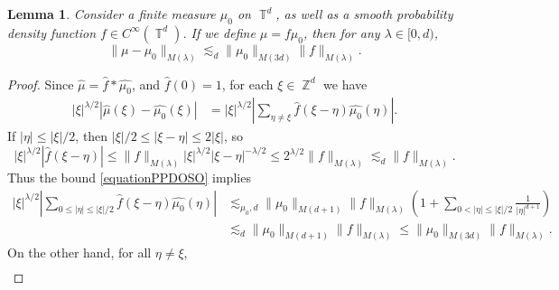 \documentclass[dvipsnames,letterpaper,12pt]{article}
\numberwithin{equation}{section}
\DeclareMathOperator{\ZZ}{\mathbb{Z}}
\DeclareMathOperator{\TT}{\mathbb{T}}
\newtheorem{lemma}[theorem]{Lemma}
\numberwithin{theorem}{section}
\begin{document}
\begin{lemma} \label{LemmaTTSICICS}
    Consider a finite measure $\mu_0$ on $\TT^d$, as well as a smooth probability density function $f \in C^\infty(\TT^d)$. If we define $\mu = f \mu_0$, then for any $\lambda \in [0,d)$,
    \[ \| \mu - \mu_0 \|_{M(\lambda)} \lesssim_d \| \mu_0 \|_{M(3d)} \| f \|_{M(\lambda)}. \]
\end{lemma}
\begin{proof}
    Since $\widehat{\mu} = \widehat{f} * \widehat{\mu_0}$, and $\widehat{f}(0) = 1$, for each $\xi \in \ZZ^d$ we have
    \begin{equation} \label{equationPPYTUECUUCS}
    \begin{split}
        |\xi|^{\lambda/2} |\widehat{\mu}(\xi) - \widehat{\mu_0}(\xi)| &= |\xi|^{\lambda/2} \left| \sum_{\eta \neq \xi} \widehat{f}(\xi - \eta) \widehat{\mu_0}(\eta) \right|.
    \end{split}
    \end{equation}
    If $|\eta| \leq |\xi|/2$, then $|\xi|/2 \leq |\xi - \eta| \leq 2 |\xi|$, so
    \begin{equation} \label{equationPPDOSO}
        |\xi|^{\lambda/2} |\widehat{f}(\xi - \eta)| \leq \| f \|_{M(\lambda)} |\xi|^{\lambda/2} |\xi-\eta|^{-\lambda/2} \leq 2^{\lambda/2} \| f \|_{M(\lambda)} \lesssim_d \| f \|_{M(\lambda)}.
    \end{equation}
    Thus the bound \eqref{equationPPDOSO} implies
    \begin{equation} \label{equationGGPSOVVCSI}
    \begin{split}
        |\xi|^{\lambda/2} \left| \sum_{0 \leq |\eta| \leq |\xi|/2} \widehat{f}(\xi - \eta) \widehat{\mu_0}(\eta) \right| &\lesssim_{\mu_0,d} \| \mu_0 \|_{M(d+1)} \| f \|_{M(\lambda)} \left( 1 + \sum_{0 < |\eta| \leq |\xi|/2} \frac{1}{|\eta|^{d+1}} \right)\\
        &\lesssim_d \| \mu_0 \|_{M(d+1)} \| f \|_{M(\lambda)} \leq \| \mu_0 \|_{M(3d)} \| f \|_{M(\lambda)}.
    \end{split}
    \end{equation}
    On the other hand, for all $\eta \neq \xi$,
    \begin{equation} \label{equationGGDPSOX}
    \begin{split}

\end{split}
\end{equation}
\end{proof}
\end{document}
